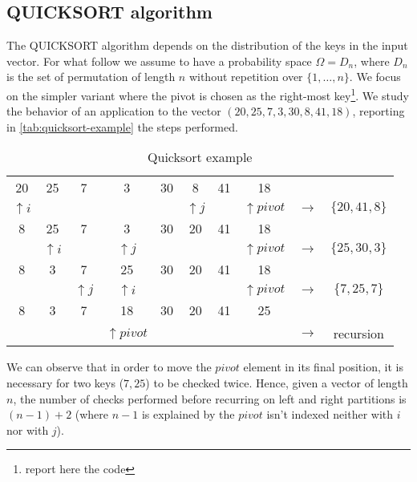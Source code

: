 \subsection{QUICKSORT algorithm}
The QUICKSORT algorithm depends on the distribution of the keys in the
input vector. For what follow we assume to have a probability space
$\Omega = D_n$, where $D_n$ is the set of permutation of length $n$
without repetition over $\{1,\ldots,n\}$. We focus on the simpler
variant where the pivot is chosen as the right-most
key\footnote{report here the code}.  We study the behavior of an
application to the vector $\left ( 20, 25, 7, 3, 30, 8, 41,
  18\right)$, reporting in \autoref{tab:quicksort-example} the steps
performed.
\begin{table}[ht]
  \caption{Quicksort example}
  \label{tab:quicksort-example}
  \begin{center}
    \begin{tabular}{cccccccccc}
      20 & 25 & 7 & 3 & 30 & 8 & 41 & 18 &  &  \\ 
      $\uparrow i$ & & & & & $\uparrow j$ & & $\uparrow pivot$ &
      $\rightarrow$ & $\{20, 41, 8\}$ \\
      8 & 25 & 7 & 3 & 30 & 20 & 41 & 18 &  &  \\ 
       & $\uparrow i$ & & $\uparrow j$ & &  & & $\uparrow pivot$ &
       $\rightarrow$ & $\{25, 30, 3\}$ \\
       8 & 3 & 7 & 25 & 30 & 20 & 41 & 18 &  &  \\ 
       &  & $\uparrow j$ & $\uparrow i$ & &  & & $\uparrow pivot$ &
       $\rightarrow$ & $\{7, 25, 7\}$ \\
       8 & 3 & 7 & 18 & 30 & 20 & 41 & 25 &  &  \\ 
       &  &  & $\uparrow pivot$ & &  & &  &
       $\rightarrow$ & recursion \\
    \end{tabular}
  \end{center}
\end{table}
We can observe that in order to move the $pivot$ element in its final
position, it is necessary for two keys ($7, 25$) to be checked
twice. Hence, given a vector of length $n$, the number of checks
performed before recurring on left and right partitions is $(n-1) + 2$
(where $n-1$ is explained by the $pivot$ isn't indexed neither with
$i$ nor with $j$).

